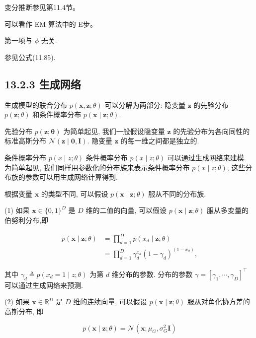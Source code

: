 \documentclass[10pt]{article}
\begin{document}
变分推断参见第11.4节。

可以看作 EM 算法中的 E步。

第一项与 $\phi$ 无关.

参见公式(11.85).

\subsection*{13.2.3 生成网络}
生成模型的联合分布 $p(\boldsymbol{x}, \boldsymbol{z} ; \theta)$ 可以分解为两部分: 隐变量 $\boldsymbol{z}$ 的先验分布 $p(\boldsymbol{z} ; \theta)$ 和条件概率分布 $p(\boldsymbol{x} \mid \boldsymbol{z} ; \theta)$.

先验分布 $p(\boldsymbol{z} ; \boldsymbol{\theta})$ 为简单起见, 我们一般假设隐变量 $\boldsymbol{z}$ 的先验分布为各向同性的标准高斯分布 $\mathcal{N}(\boldsymbol{z} \mid \mathbf{0}, \boldsymbol{I})$. 隐变量 $\boldsymbol{z}$ 的每一维之间都是独立的.

条件概率分布 $p(x \mid z ; \theta)$ 条件概率分布 $p(x \mid z ; \theta)$ 可以通过生成网络来建模. 为简单起见, 我们同样用参数化的分布族来表示条件概率分布 $p(x \mid z ; \theta)$, 这些分布族的参数可以用生成网络计算得到.

根据变量 $\boldsymbol{x}$ 的类型不同, 可以假设 $p(\boldsymbol{x} \mid \boldsymbol{z} ; \theta)$ 服从不同的分布族.

(1) 如果 $\boldsymbol{x} \in\{0,1\}^{D}$ 是 $D$ 维的二值的向量, 可以假设 $p(\boldsymbol{x} \mid \boldsymbol{z} ; \theta)$ 服从多变量的伯努利分布,即


\begin{align*}
p(\boldsymbol{x} \mid \boldsymbol{z} ; \theta) & =\prod_{d=1}^{D} p\left(x_{d} \mid \boldsymbol{z} ; \theta\right)  \tag{13.16}\\
& =\prod_{d=1}^{D} \gamma_{d}^{x_{d}}\left(1-\gamma_{d}\right)^{\left(1-x_{d}\right)}, \tag{13.17}
\end{align*}


其中 $\gamma_{d} \triangleq p\left(x_{d}=1 \mid z ; \theta\right)$ 为第 $d$ 维分布的参数. 分布的参数 $\gamma=\left[\gamma_{1}, \cdots, \gamma_{D}\right]^{\top}$ 可以通过生成网络来预测.

(2) 如果 $\boldsymbol{x} \in \mathbb{R}^{D}$ 是 $D$ 维的连续向量, 可以假设 $p(\boldsymbol{x} \mid \boldsymbol{z} ; \theta)$ 服从对角化协方差的高斯分布, 即


\begin{equation*}
p(\boldsymbol{x} \mid \boldsymbol{z} ; \theta)=\mathcal{N}\left(\boldsymbol{x} ; \mu_{G}, \sigma_{G}^{2} \boldsymbol{I}\right) \tag{13.18}
\end{equation*}
\end{document}
